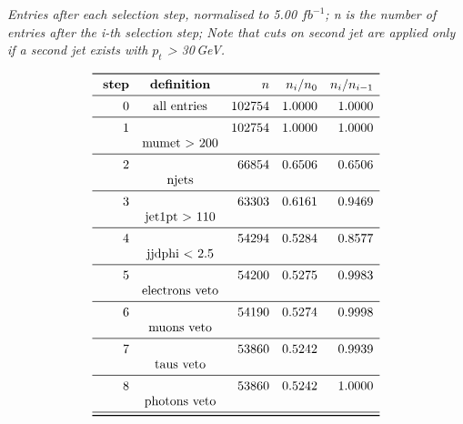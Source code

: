 \documentclass[11pt,a4paper]{article}
\begin{document}
\begin{table}
\caption{\emph{Entries after each selection step, normalised to 5.00 $fb^{-1}$; n is the number of entries after the i-th selection step; Note that cuts on second jet are applied only if a second jet exists with $p_t$ > 30\,GeV.}}
\[
\begin{array}{rcrrr}
\toprule
\ \textbf{step}& \textbf{definition}  & n  &  n_i/n_0 & n_i/n_{i-1}  \\ 
\midrule
 0  & \text{all entries} & 102754 & 1.0000 & 1.0000 \\
\midrule
 1  & & 102754 & 1.0000 & 1.0000 \\
& \text{mumet > 200} & & & \\
\midrule
 2  & &  66854 & 0.6506 & 0.6506 \\
& \text{njets} & & & \\
\midrule
 3  & &  63303 & 0.6161 & 0.9469 \\
& \text{jet1pt >  110} & & & \\
\midrule
 4  & &  54294 & 0.5284 & 0.8577 \\
& \text{jjdphi < 2.5} & & & \\
\midrule
 5  & &  54200 & 0.5275 & 0.9983 \\
& \text{electrons veto} & & & \\
\midrule
 6  & &  54190 & 0.5274 & 0.9998 \\
& \text{muons veto} & & & \\
\midrule
 7  & &  53860 & 0.5242 & 0.9939 \\
& \text{taus veto} & & & \\
\midrule
 8  & &  53860 & 0.5242 & 1.0000 \\
& \text{photons veto} & & & \\
\midrule
\bottomrule
\end{array}
\]
\end{table}
\end{document}
